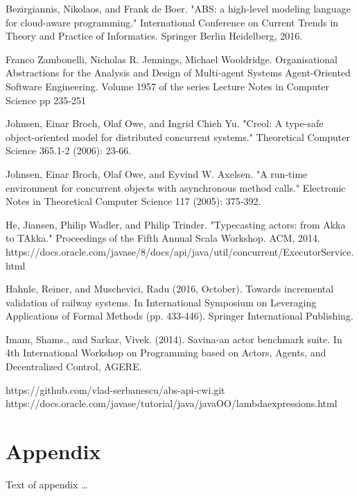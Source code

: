 \documentclass[sigplan,10pt,review,anonymous]{acmart}\settopmatter{printfolios=true}
\begin{document}
\begin{thebibliography}{4}
	 Bezirgiannis, Nikolaos, and Frank de Boer. "ABS: a high-level modeling language for cloud-aware programming." International Conference on Current Trends in Theory and Practice of Informatics. Springer Berlin Heidelberg, 2016.
	
	Franco Zambonelli, Nicholas R. Jennings, Michael Wooldridge. 
	Organisational Abstractions for the Analysis and Design of Multi-agent Systems
	Agent-Oriented Software Engineering. Volume 1957 of the series Lecture Notes in Computer Science pp 235-251
	
	 Johnsen, Einar Broch, Olaf Owe, and Ingrid Chieh Yu. "Creol: A type-safe object-oriented model for distributed concurrent systems." Theoretical Computer Science 365.1-2 (2006): 23-66.
	
	 Johnsen, Einar Broch, Olaf Owe, and Eyvind W. Axelsen. "A run-time environment for concurrent objects with asynchronous method calls." Electronic Notes in Theoretical Computer Science 117 (2005): 375-392.
	
	 He, Jiansen, Philip Wadler, and Philip Trinder. "Typecasting actors: from Akka to TAkka." Proceedings of the Fifth Annual Scala Workshop. ACM, 2014.
	 https://docs.oracle.com/javase/8/docs/api/java/util/concurrent/ExecutorService.html
	
	Hahnle, Reiner, and Muschevici, Radu (2016, October). Towards incremental validation of railway systems. In International Symposium on Leveraging Applications of Formal Methods (pp. 433-446). Springer International Publishing.
	
	 Imam, Shams., and Sarkar, Vivek. (2014). Savina-an actor benchmark suite. In 4th International Workshop on Programming based on Actors, Agents, and Decentralized Control, AGERE.
	
	https://github.com/vlad-serbanescu/abs-api-cwi.git
	 https://docs.oracle.com/javase/tutorial/java/javaOO/lambdaexpressions.html
\end{thebibliography}
%


\appendix
\section{Appendix}

Text of appendix \ldots
\end{document}
